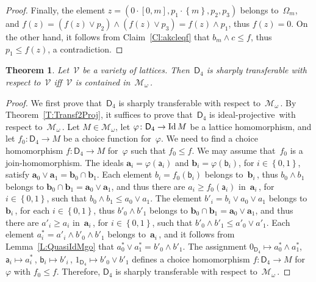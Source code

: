 \documentclass[reqno]{amsart}
\numberwithin{equation}{section}
\theoremstyle{plain}
\newtheorem{theorem}{Theorem}[section]
\theoremstyle{definition}
\theoremstyle{remark}
\numberwithin{figure}{section}
\numberwithin{table}{section}
\begin{document}
\begin{proof}
Finally, the element $z=(0\cdot[0,m],p_1\cdot{\left\{{m}\right\}},p_2,p_3)$ belongs to~${\Omega}_m$, and
$f(z)=(f(z)\vee p_2)\wedge(f(z)\vee p_3)=f(z)\wedge p_1$, thus $f(z)=0$.
On the other hand, it follows from Claim~\ref{Cl:akcleqf} that $b_m\wedge c\leq f$, thus $p_1\leq f(z)$, a contradiction.
\end{proof}

\begin{theorem}\label{T:IdProjD}
Let~${\mathcal{V}}$ be a variety of lattices.
Then~${\mathsf{D}_{4}}$ is sharply transferable with respect to~${\mathcal{V}}$ if{f}~${\mathcal{V}}$ is contained in~${\mathcal{M}}_{\omega}$\,.
\end{theorem}

\begin{proof}
We first prove that~${\mathsf{D}_{4}}$ is sharply transferable with respect to~${\mathcal{M}}_{\omega}$\,.
By Theorem~\ref{T:Transf2Proj}, it suffices to prove that~${\mathsf{D}_{4}}$ is {i\-de\-al-pro\-jec\-tive}\ with respect to~${\mathcal{M}}_{\omega}$\,.
Let $M\in{\mathcal{M}}_{\omega}$, let ${\varphi}\colon{\mathsf{D}_{4}}\to\nobreak\operatorname{Id} M$ be a lattice homomorphism, and let $f_0\colon{\mathsf{D}_{4}}\to M$ be a choice function for~${\varphi}$.
We need to find a choice homomorphism $f\colon{\mathsf{D}_{4}}\to M$ for~${\varphi}$ such that $f_0\leq f$.
We may assume that~$f_0$ is a {join-ho\-mo\-mor\-phism}.
The ideals ${\boldsymbol{a}}_i={\varphi}({\mathsf{a}}_i)$ and ${\boldsymbol{b}}_i={\varphi}({\mathsf{b}}_i)$, for $i\in{\left\{{0,1}\right\}}$, satisfy ${\boldsymbol{a}}_0\vee{\boldsymbol{a}}_1={\boldsymbol{b}}_0\cap{\boldsymbol{b}}_1$.
Each element $b_i=f_0({\mathsf{b}}_i)$ belongs to~${\boldsymbol{b}}_i$\,, thus $b_0\wedge b_1$ belongs to ${\boldsymbol{b}}_0\cap{\boldsymbol{b}}_1={\boldsymbol{a}}_0\vee{\boldsymbol{a}}_1$, and thus there are $a_i\geq f_0({\mathsf{a}}_i)$ in~${\boldsymbol{a}}_i$\,, for $i\in{\left\{{0,1}\right\}}$, such that $b_0\wedge b_1\leq a_0\vee a_1$.
The element $b'_i=b_i\vee a_0\vee a_1$ belongs to~${\boldsymbol{b}}_i$\,, for each $i\in{\left\{{0,1}\right\}}$, thus
$b'_0\wedge b'_1$ belongs to ${\boldsymbol{b}}_0\cap{\boldsymbol{b}}_1={\boldsymbol{a}}_0\vee{\boldsymbol{a}}_1$, and thus there are $a'_i\geq a_i$ in~${\boldsymbol{a}}_i$\,, for $i\in{\left\{{0,1}\right\}}$, such that $b'_0\wedge b'_1\leq a'_0\vee a'_1$.
Each element $a^*_i=a'_i\wedge b'_0\wedge b'_1$ belongs to~${\boldsymbol{a}}_i$\,, and it follows from Lemma~\ref{L:QuasiIdMgo} that $a^*_0\vee a^*_1=b'_0\wedge b'_1$.
The assignment $0_{\mathsf{D}_{4}}\mapsto a^*_0\wedge a^*_1$, ${\mathsf{a}}_i\mapsto a^*_i$\,, ${\mathsf{b}}_i\mapsto b'_i$\,, $1_{\mathsf{D}_{4}}\mapsto b'_0\vee b'_1$ defines a choice homomorphism $f\colon{\mathsf{D}_{4}}\to M$ for~${\varphi}$ with $f_0\leq f$.
Therefore, ${\mathsf{D}_{4}}$ is sharply transferable with respect to~${\mathcal{M}}_{\omega}$\,.


\end{proof}
\end{document}
